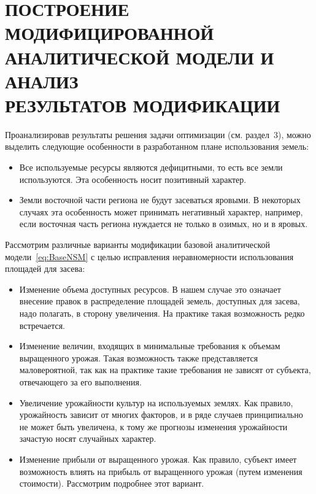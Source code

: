 \section[Построение модифицированной аналитической модели и \\ анализ результатов модификации]{ПОСТРОЕНИЕ МОДИФИЦИРОВАННОЙ \\ АНАЛИТИЧЕСКОЙ МОДЕЛИ И АНАЛИЗ \\ РЕЗУЛЬТАТОВ МОДИФИКАЦИИ}
 
Проанализировав результаты решения задачи оптимизации (см. раздел~3), можно выделить
следующие особенности в разработанном плане использования земель:
\begin{itemize}
  \item Все используемые ресурсы являются дефицитными, то есть все земли используются.
    Эта особенность носит позитивный характер.
  \item Земли восточной части региона не будут засеваться яровыми. В некоторых случаях
    эта особенность может принимать негативный характер, например, если восточная часть региона нуждается 
    не только в озимых, но и в яровых. 
\end{itemize}

Рассмотрим различные варианты модификации базовой аналитической модели~\eqref{eq:BaseNSM} с целью исправления
неравномерности использования площадей для засева:
\begin{itemize}
  \item Изменение объема доступных ресурсов. В нашем случае это означает внесение правок в распределение
    площадей земель, доступных для засева, надо полагать, в сторону увеличения. На практике такая возможность
    редко встречается.
  \item Изменение величин, входящих в минимальные требования к объемам выращенного урожая.
    Такая возможность также представляется маловероятной, так как на практике такие требования не зависят
    от субъекта, отвечающего за его выполнения.
  \item Увеличение урожайности культур на используемых землях. Как правило, урожайность зависит от многих факторов,
    и в ряде случаев принципиально не может быть увеличена, к тому же прогнозы изменения урожайности зачастую 
    носят случайных характер.
  \item Изменение прибыли от выращенного урожая. Как правило, субъект имеет возможность влиять на прибыль
    от выращенного урожая (путем изменения стоимости). Рассмотрим подробнее этот вариант.
\end{itemize}

